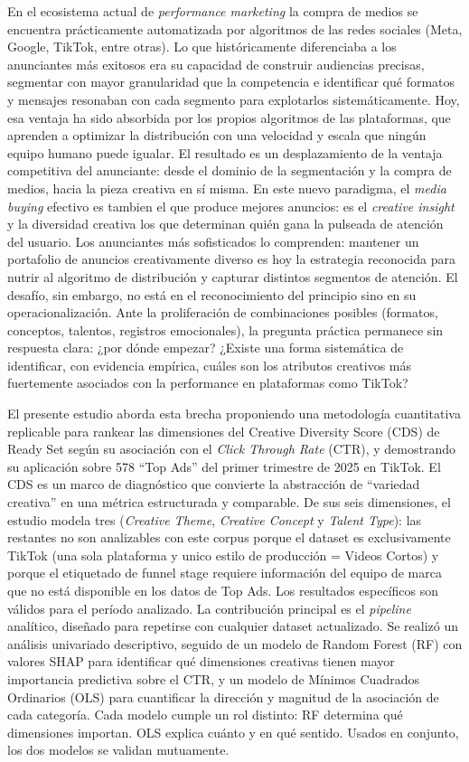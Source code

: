 \documentclass[12pt, a4paper]{report}
\begin{document}
En el ecosistema actual de \textit{performance marketing} la compra de medios
se encuentra prácticamente automatizada por algoritmos de las redes sociales
(Meta, Google, TikTok, entre otras). Lo que históricamente diferenciaba a los anunciantes más exitosos
era su capacidad de construir audiencias precisas, segmentar con mayor
granularidad que la competencia e identificar qué formatos y mensajes
resonaban con cada segmento para explotarlos sistemáticamente. Hoy, esa
ventaja ha sido absorbida por los propios algoritmos de las plataformas, que
aprenden a optimizar la distribución con una velocidad y escala que ningún
equipo humano puede igualar. El resultado es un desplazamiento de la ventaja
competitiva del anunciante: desde el dominio de la segmentación y la compra
de medios, hacia la pieza creativa en sí misma. En este nuevo paradigma,
el \textit{media buying} efectivo es tambien el que produce mejores anuncios: es el
\textit{creative insight} y la diversidad creativa los que determinan
quién gana la pulseada de atención del usuario. Los anunciantes más
sofisticados lo comprenden: mantener un portafolio de anuncios creativamente
diverso es hoy la estrategia reconocida para nutrir al algoritmo de distribución
y capturar distintos segmentos de atención. El desafío, sin embargo, no está en
el reconocimiento del principio sino en su operacionalización. Ante la
proliferación de combinaciones posibles (formatos, conceptos, talentos,
registros emocionales), la pregunta práctica permanece sin respuesta clara: ¿por
dónde empezar? ¿Existe una forma sistemática de identificar, con evidencia
empírica, cuáles son los atributos creativos más fuertemente asociados con la
performance en plataformas como TikTok?

El presente estudio aborda esta brecha proponiendo una metodología cuantitativa
replicable para rankear las dimensiones del Creative Diversity Score (CDS) de
Ready Set según su asociación con el \textit{Click Through Rate} (CTR), y
demostrando su aplicación sobre 578 ``Top Ads'' del primer trimestre de 2025 en
TikTok. El CDS es un marco de diagnóstico que convierte la abstracción de
``variedad creativa'' en una métrica estructurada y comparable. De sus seis
dimensiones, el estudio modela tres (\textit{Creative Theme}, \textit{Creative Concept}
y \textit{Talent Type}): las restantes no son analizables con este corpus porque el dataset
es exclusivamente TikTok (una sola plataforma y unico estilo de producción = Videos Cortos) y porque
el etiquetado de funnel stage requiere información del equipo de marca que no está
disponible en los datos de Top Ads. Los resultados específicos son válidos para el período
analizado. La contribución principal es el \textit{pipeline} analítico, diseñado
para repetirse con cualquier dataset actualizado.
Se realizó un análisis univariado descriptivo, seguido de un modelo de
Random Forest (RF) con valores SHAP para identificar qué dimensiones creativas
tienen mayor importancia predictiva sobre el CTR, y un modelo de Mínimos
Cuadrados Ordinarios (OLS) para cuantificar la dirección y magnitud de la
asociación de cada categoría. Cada modelo cumple un rol distinto: RF determina
qué dimensiones importan. OLS explica cuánto y en qué sentido.
Usados en conjunto, los dos modelos se validan mutuamente.
\end{document}
